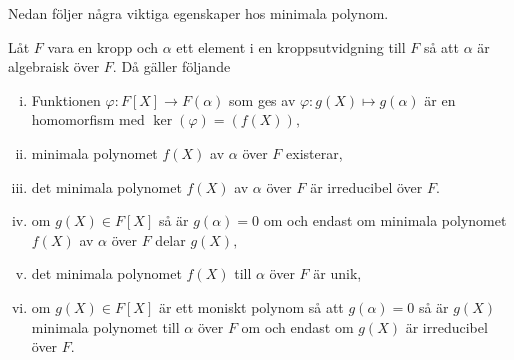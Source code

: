 \documentclass{article}
\theoremstyle{definition}
\begin{document}
Nedan följer några viktiga egenskaper hos minimala polynom.
\hypertarget{minpol}{}
\begin{mytheo}{}{}
  Låt $F$ vara en kropp och $\alpha$ ett element i en kroppsutvidgning till $F$ så att $\alpha$ är algebraisk över $F$. Då gäller följande 
  \begin{enumerate}[(i)]
    \item Funktionen $\varphi: F[X] \rightarrow F(\alpha)$ som ges av $\varphi: g(X) \mapsto g(\alpha)$ är en homomorfism med $\ker(\varphi) = (f(X)),$
    \item minimala polynomet $f(X)$ av $\alpha$ över $F$ existerar,
    \item det minimala polynomet $f(X)$ av $\alpha$ över $F$ är irreducibel över $F$.
    \item om $g(X) \in F[X]$ så är $g(\alpha) = 0$ om och endast om minimala polynomet $f(X)$ av $\alpha$ över $F$ delar $g(X),$
    \item det minimala polynomet $f(X)$ till $\alpha$ över $F$ är unik, 
    \item om $g(X) \in F[X]$ är ett moniskt polynom så att $g(\alpha) = 0$ så är $g(X)$ minimala polynomet till $\alpha$ över $F$ om och endast 
    om $g(X)$ är irreducibel över $F$.
  \end{enumerate}
\end{mytheo}
\end{document}
